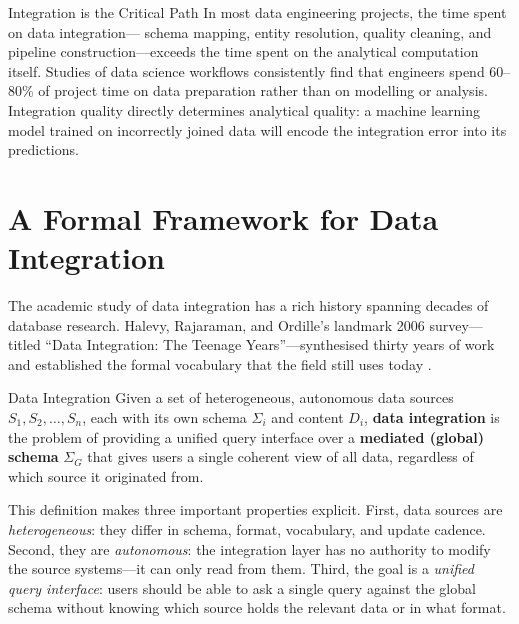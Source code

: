 \begin{keyinsight}{Integration is the Critical Path}
In most data engineering projects, the time spent on data integration---
schema mapping, entity resolution, quality cleaning, and pipeline
construction---exceeds the time spent on the analytical computation
itself. Studies of data science workflows consistently find that
engineers spend 60--80\% of project time on data preparation rather
than on modelling or analysis. Integration quality directly determines
analytical quality: a machine learning model trained on incorrectly
joined data will encode the integration error into its predictions.
\end{keyinsight}

\section{A Formal Framework for Data Integration}
\label{sec:integration-framework}

The academic study of data integration has a rich history spanning
decades of database research. Halevy, Rajaraman, and Ordille's landmark
2006 survey---titled ``Data Integration: The Teenage Years''---synthesised
thirty years of work and established the formal vocabulary that the
field still uses today \parencite{Halevy2006}.

\begin{defbox}{Data Integration}
Given a set of heterogeneous, autonomous data sources
$S_1, S_2, \ldots, S_n$, each with its own schema $\Sigma_i$ and
content $D_i$, \textbf{data integration} is the problem of providing
a unified query interface over a \textbf{mediated (global) schema}
$\Sigma_G$ that gives users a single coherent view of all data,
regardless of which source it originated from.
\end{defbox}

This definition makes three important properties explicit. First, data
sources are \emph{heterogeneous}: they differ in schema, format,
vocabulary, and update cadence. Second, they are \emph{autonomous}: the
integration layer has no authority to modify the source systems---it can
only read from them. Third, the goal is a \emph{unified query interface}:
users should be able to ask a single query against the global schema
without knowing which source holds the relevant data or in what format.

